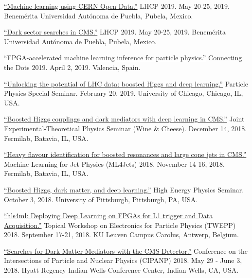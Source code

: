 \documentclass[11pt]{res}
\begin{document}
\begin{resume}
\href{https://indico.cern.ch/event/687651/contributions/3428206/}{``Machine
  learning using CERN Open Data.''} LHCP 2019. May
  20-25, 2019. Benem\'{e}rita Universidad Aut\'{o}noma de Puebla, Pubela, Mexico.

\href{https://indico.cern.ch/event/687651/contributions/3426898/}{``Dark
  sector searches in CMS.''} LHCP 2019. May
  20-25, 2019. Benem\'{e}rita Universidad Aut\'{o}noma de Puebla, Pubela, Mexico.

\href{https://indico.cern.ch/event/742793/contributions/3274392/}{``FPGA-accelerated
  machine learning inference for particle physics.''} Connecting the
Dots 2019. April 2, 2019. Valencia, Spain.

\href{https://universityofchicago.hosted.panopto.com/Panopto/Pages/Viewer.aspx?id=66ca09d7-74c1-4b12-bb57-a9fa01046cdf}{``Unlocking
  the potential of LHC data: boosted Higgs and deep learning.''}
Particle Physics Special Seminar. February 20, 2019. University of Chicago, Chicago, IL, USA.

\href{http://theory.fnal.gov/events/event/results-from-cms-18/}{``Boosted
  Higgs couplings and dark mediators with deep learning in CMS.''}
Joint Experimental-Theoretical Physics Seminar (Wine \& Cheese). December 14, 2018. Fermilab, Batavia, IL, USA.

\href{https://indico.cern.ch/event/745718/contributions/3211982/}{``Heavy
  flavour identification for boosted resonances and large cone jets in
  CMS.''} Machine Learning for Jet Physics (ML4Jets) 2018. November
14-16, 2018. Fermilab, Batavia, IL, USA.

\href{https://www.physicsandastronomy.pitt.edu/events/hep-seminar-javier-duarte-fermilab}{``Boosted
    Higgs, dark matter, and deep learning.''} High Energy Physics
  Seminar. October 3, 2018. University of Pittsburgh, Pittsburgh, PA, USA.

\href{https://indico.cern.ch/event/697988/contributions/3055990/}{``hls4ml:
    Deploying Deep Learning on FPGAs for L1 trigger and Data
    Acquisition.''} Topical Workshop on Electronics for
  Particle Physics (TWEPP) 2018. September 17-21, 2018. KU Leuven Campus Carolus, Antwerp, Belgium.

\href{https://conferences.lbl.gov/event/137/session/27/contribution/354}{``Searches
    for Dark Matter Mediators with the CMS Detector.''} Conference on the Intersections of Particle and Nuclear
  Physics (CIPANP) 2018. May 29 - June 3, 2018. Hyatt Regency Indian Wells
  Conference Center, Indian Wells, CA, USA.


\end{resume}
\end{document}
